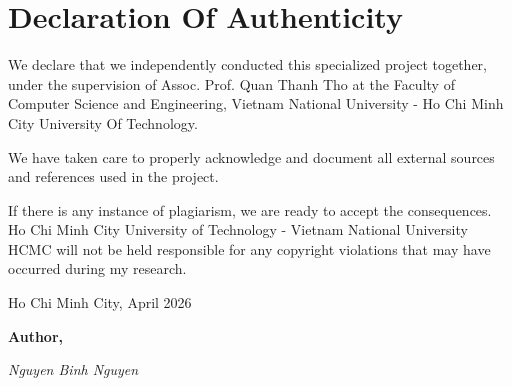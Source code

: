 \newpage

\section*{\Huge Declaration Of Authenticity}

 We declare that we independently conducted this specialized project together, under the supervision of Assoc. Prof. Quan Thanh Tho at the Faculty of Computer Science and Engineering, Vietnam National University - Ho Chi Minh City University Of Technology.

We have taken care to properly acknowledge and document all external sources and references used in the project.

If there is any instance of plagiarism, we are ready to accept the consequences. Ho Chi Minh City University of Technology - Vietnam National University HCMC will not be held responsible for any copyright violations that may have occurred during my research.
\newline

\begin{flushright}
\begin{minipage}[t]{0.48\textwidth}
\begin{center}
    Ho Chi Minh City, April 2026
    
    \textbf{Author,}

    \textit{Nguyen Binh Nguyen}
    \end{center}
\end{minipage}
\end{flushright}
\begin{flushright}
    
\end{flushright}